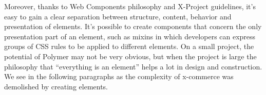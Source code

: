 Moreover, thanks to Web Components philosophy and X-Project guidelines, it’s easy to gain a clear separation between structure, content, behavior and presentation of elements. It’s possible to create components that concern the only presentation part of an element, such as mixins in which developers can express groups of CSS rules to be applied to different elements.
\newline
On a small project, the potential of Polymer may not be very obvious, but when the project is large the philosophy that “everything is an element” helps a lot in design and construction.
\newline
We see in the following paragraphs as the complexity of x-commerce was demolished by creating elements.